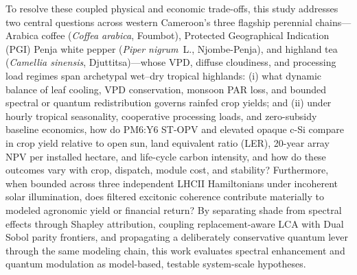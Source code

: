 \documentclass[preprint,12pt,a4paper]{elsarticle}
\begin{document}
To resolve these coupled physical and economic trade-offs, this study addresses two central questions across western Cameroon's three flagship perennial chains---Arabica coffee (\textit{Coffea arabica}, Foumbot), Protected Geographical Indication (PGI) Penja white pepper (\textit{Piper nigrum}~L., Njombe-Penja), and highland tea (\textit{Camellia sinensis}, Djuttitsa)---whose VPD, diffuse cloudiness, and processing load regimes span archetypal wet--dry tropical highlands: (i) what dynamic balance of leaf cooling, VPD conservation, monsoon PAR loss, and bounded spectral or quantum redistribution governs rainfed crop yields; and (ii) under hourly tropical seasonality, cooperative processing loads, and zero-subsidy baseline economics, how do PM6:Y6 ST-OPV and elevated opaque c-Si compare in crop yield relative to open sun, land equivalent ratio (LER), 20-year array NPV per installed hectare, and life-cycle carbon intensity, and how do these outcomes vary with crop, dispatch, module cost, and stability? Furthermore, when bounded across three independent LHCII Hamiltonians under incoherent solar illumination, does filtered excitonic coherence contribute materially to modeled agronomic yield or financial return? By separating shade from spectral effects through Shapley attribution, coupling replacement-aware LCA with Dual Sobol parity frontiers, and propagating a deliberately conservative quantum lever through the same modeling chain, this work evaluates spectral enhancement and quantum modulation as model-based, testable system-scale hypotheses.

\end{document}
